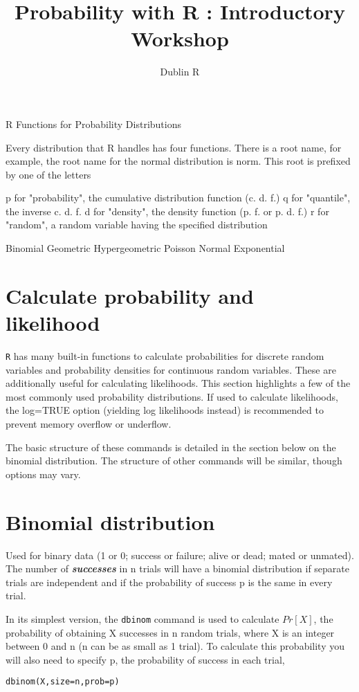 \documentclass[12pt, a4paper]{article}
\author{ }
\theoremstyle{plain}
\theoremstyle{definition}
\theoremstyle{remark}
\begin{document}
\author{Dublin R}
\title{Probability with R : Introductory Workshop}
\maketitle

R Functions for Probability Distributions

Every distribution that R handles has four functions. There is a root name, for example, the root name for the normal distribution is norm. This root is prefixed by one of the letters

p for "probability", the cumulative distribution function (c. d. f.)
q for "quantile", the inverse c. d. f.
d for "density", the density function (p. f. or p. d. f.)
r for "random", a random variable having the specified distribution


\newpage
Binomial
Geometric
Hypergeometric
Poisson
Normal
Exponential

\section{Calculate probability and likelihood}
\texttt{R} has many built-in functions to calculate probabilities for discrete random variables and probability densities for continuous random variables. These are additionally useful for calculating likelihoods. This section highlights a few of the most commonly used probability distributions. If used to calculate likelihoods, the log=TRUE option (yielding log likelihoods instead) is recommended to prevent memory overflow or underflow.

The basic structure of these commands is detailed in the section below on the binomial distribution. The structure of other commands will be similar, though options may vary.

\section{Binomial distribution}
Used for binary data (1 or 0; success or failure; alive or dead; mated or unmated). The number of \textbf{\textit{successes}} in n trials will have a binomial distribution if separate trials are independent and if the probability of success p is the same in every trial.

In its simplest version, the \texttt{dbinom} command is used to calculate $Pr[X]$, the probability of obtaining X successes in n random trials, where X is an integer between 0 and n (n can be as small as 1 trial). To calculate this probability you will also need to specify p, the probability of success in each trial,
\begin{framed}
\begin{verbatim}
dbinom(X,size=n,prob=p)
\end{verbatim}
\end{framed}
\end{document}
